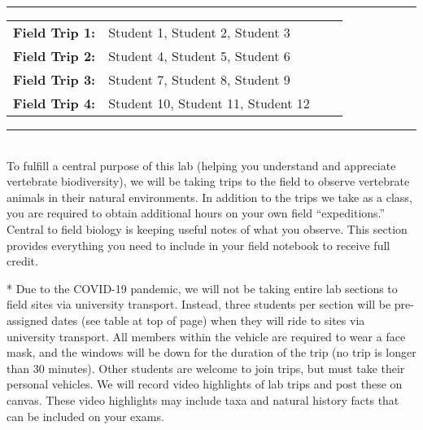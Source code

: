 \documentclass[11pt, a4paper]{article}
\begin{document}
\pagestyle{fancyplain}
\fancyhf{}
\thispagestyle{plain}

\begin{center}
\begin{singlespace}
\rule{6in}{0.4pt}
\begin{minipage}[t]{.75\textwidth}
\begin{tabular}{llll}
\textbf{Field Trip 1:} & Student 1,  Student 2,  Student 3 \\ \textbf{Field Trip 2:} & Student 4,  Student 5,  Student 6 \\ \textbf{Field Trip 3:} & Student 7,  Student 8,  Student 9 \\ \textbf{Field Trip 4:} & Student 10, Student 11, Student 12
\end{tabular}
\end{minipage}
\rule{6in}{0.4pt}
\end{singlespace}
\end{center}
\vspace{.5cm}
\setlength{\unitlength}{1in}
\renewcommand{\arraystretch}{2}


\justify
{}\\ %
To fulfill a central purpose of this lab (helping you understand and appreciate vertebrate biodiversity), we will be taking trips to the field to observe vertebrate animals in their natural environments. In addition to the trips we take as a class, you are required to obtain additional hours on your own field ``expeditions.'' Central to field biology is keeping useful notes of what you observe. This section provides everything you need to include in your field notebook to receive full credit.

* Due to the COVID-19 pandemic, we will not be taking entire lab sections to field sites via university transport. Instead, three students per section will be pre-assigned dates (see table at top of page) when they will ride to sites via university transport. All members within the vehicle are required to wear a face mask, and the windows will be down for the duration of the trip (no trip is longer than 30 minutes). Other students are welcome to join trips, but must take their personal vehicles. We will record video highlights of lab trips and post these on canvas. These video highlights may include taxa and natural history facts that can be included on your exams.
\end{document}
